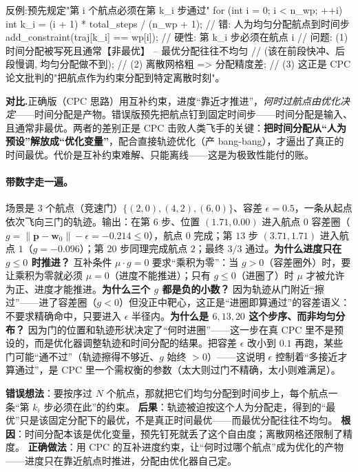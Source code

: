 \begin{codebox}[C++]{反例:预先规定"第 i 个航点必须在第 k\_i 步通过"}
for (int i = 0; i < n_wp; ++i) {
  int k_i = (i + 1) * total_steps / (n_wp + 1);  // 错: 人为均匀分配航点到时间步
  add_constraint(traj[k_i] == wp[i]);             // 硬性: 第 k_i 步必须在航点 i
}
// 问题: (1) 时间分配被写死且通常【非最优】 -- 最优分配往往不均匀
//           (该在前段快冲、后段慢调, 均匀分配做不到);
//       (2) 离散网格粗 => 分配精度差;
//       (3) 这正是 CPC 论文批判的"把航点作为约束分配到特定离散时刻"。
\end{codebox}

\noindent\textbf{对比.}\;正确版（CPC 思路）用互补约束，进度“靠近才推进”，\emph{何时过航点由优化决定}——时间分配是产物。错误版预先把航点钉到固定时间步——时间分配是输入、且通常非最优。两者的差别正是 CPC 击败人类飞手的关键：\textbf{把时间分配从“人为预设”解放成“优化变量”}，配合直接轨迹优化（产 bang-bang），才逼出了真正的时间最优。代价是互补约束难解、只能离线——这是为极致性能付的账。

\paragraph{带数字走一遍。}
场景是 $3$ 个航点（竞速门）$\{(2,0),(4,2),(6,0)\}$、容差 $\epsilon=0.5$，一条从起点依次飞向三门的轨迹。输出：在第 $6$ 步、位置 $(1.71,0.00)$ 进入航点 $0$ 容差圈（$g=\|\mathbf p-\mathbf w_0\|-\epsilon=-0.214\le 0$），航点 $0$ 完成；第 $13$ 步 $(3.71,1.71)$ 进入航点 $1$（$g=-0.096$）；第 $20$ 步同理完成航点 $2$；最终 $3/3$ 通过。\textbf{为什么进度只在 $g\le 0$ 时推进？} 互补条件 $\mu\cdot g=0$ 要求“乘积为零”：当 $g>0$（容差圈外）时，要让乘积为零就必须 $\mu=0$（进度不能推进）；只有 $g\le 0$（进圈了）时 $\mu$ 才被允许为正、进度才能推进。\textbf{为什么三个 $g$ 都是负的小数？} 因为轨迹从门附近“擦过”——进了容差圈（$g<0$）但没正中靶心，这正是“进圈即算通过”的容差语义：不要求精确命中，只要进入 $\epsilon$ 半径内。\textbf{为什么是 $6,13,20$ 这个步序、而非均匀分布？} 因为门的位置和轨迹形状决定了“何时进圈”——这一步在真 CPC 里不是预设的，而是优化器调整轨迹和时间分配的结果。把容差 $\epsilon$ 改小到 $0.1$ 再跑，某些门可能“通不过”（轨迹擦得不够近、$g$ 始终 $>0$）——这说明 $\epsilon$ 控制着“多接近才算通过”，是 CPC 里一个需权衡的参数（太大则过门不精确，太小则难满足）。

\begin{pitfall}
\textbf{错误想法}：要按序过 $N$ 个航点，那就把它们均匀分配到时间步上，每个航点一条“第 $k_i$ 步必须在此”的约束。\;
\textbf{后果}：轨迹被迫按这个人为分配走，得到的“最优”只是该固定分配下的最优，不是真正时间最优——而最优分配往往不均匀。\;
\textbf{根因}：时间分配本该是优化变量，预先钉死就丢了这个自由度；离散网格还限制了精度。\;
\textbf{正确做法}：用 CPC 的互补进度约束，让“何时过哪个航点”成为优化的产物——进度只在靠近航点时推进，分配由优化器自己定。
\end{pitfall}

